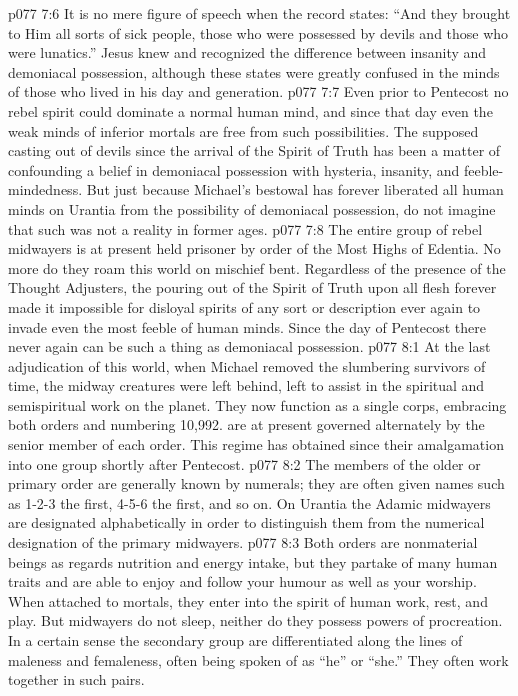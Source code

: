 \vs p077 7:6 It is no mere figure of speech when the record states: “And they brought to Him all sorts of sick people, those who were possessed by devils and those who were lunatics.” Jesus knew and recognized the difference between insanity and demoniacal possession, although these states were greatly confused in the minds of those who lived in his day and generation.
\vs p077 7:7 Even prior to Pentecost no rebel spirit could dominate a normal human mind, and since that day even the weak minds of inferior mortals are free from such possibilities. The supposed casting out of devils since the arrival of the Spirit of Truth has been a matter of confounding a belief in demoniacal possession with hysteria, insanity, and feeble\hyp{}mindedness. But just because Michael’s bestowal has forever liberated all human minds on Urantia from the possibility of demoniacal possession, do not imagine that such was not a reality in former ages.
\vs p077 7:8 The entire group of rebel midwayers is at present held prisoner by order of the Most Highs of Edentia. No more do they roam this world on mischief bent. Regardless of the presence of the Thought Adjusters, the pouring out of the Spirit of Truth upon all flesh forever made it impossible for disloyal spirits of any sort or description ever again to invade even the most feeble of human minds. Since the day of Pentecost there never again can be such a thing as demoniacal possession.
\vs p077 8:1 At the last adjudication of this world, when Michael removed the slumbering survivors of time, the midway creatures were left behind, left to assist in the spiritual and semispiritual work on the planet. They now function as a single corps, embracing both orders and numbering 10,992.  are at present governed alternately by the senior member of each order. This regime has obtained since their amalgamation into one group shortly after Pentecost.
\vs p077 8:2 The members of the older or primary order are generally known by numerals; they are often given names such as 1\hyp{}2\hyp{}3 the first, 4\hyp{}5\hyp{}6 the first, and so on. On Urantia the Adamic midwayers are designated alphabetically in order to distinguish them from the numerical designation of the primary midwayers.
\vs p077 8:3 Both orders are nonmaterial beings as regards nutrition and energy intake, but they partake of many human traits and are able to enjoy and follow your humour as well as your worship. When attached to mortals, they enter into the spirit of human work, rest, and play. But midwayers do not sleep, neither do they possess powers of procreation. In a certain sense the secondary group are differentiated along the lines of maleness and femaleness, often being spoken of as “he” or “she.” They often work together in such pairs.
